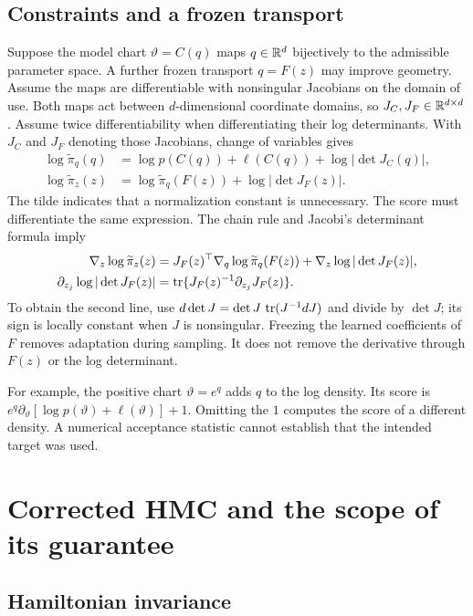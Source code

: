\subsection{Constraints and a frozen transport}

Suppose the model chart $\vartheta=C(q)$ maps $q\in\mathbb{R}^d$ bijectively to
the admissible parameter space. A further frozen transport $q=F(z)$ may
improve geometry. Assume the maps are differentiable with nonsingular
Jacobians on the domain of use. Both maps act between $d$-dimensional
coordinate domains, so $J_C,J_F\in\mathbb{R}^{d\times d}$. Assume twice
differentiability when differentiating their log determinants. With $J_C$
and $J_F$ denoting those Jacobians, change of variables gives
\begin{align}
 \log\widetilde\pi_q(q)
 &=\log p(C(q))+\ell(C(q))+\log|\det J_C(q)|,\\
 \log\widetilde\pi_z(z)
 &=\log\widetilde\pi_q(F(z))+\log|\det J_F(z)|.
 \label{eq:bf-modern-transformed-target}
\end{align}
The tilde indicates that a normalization constant is unnecessary. The score
must differentiate the same expression. The chain rule and Jacobi's
determinant formula imply
\begin{align}
 \nabla_z\log\widetilde\pi_z(z)
 &=J_F(z)^\top\nabla_q\log\widetilde\pi_q(F(z))
      +\nabla_z\log|\det J_F(z)|,\\
 \partial_{z_j}\log|\det J_F(z)|
 &=\operatorname{tr}\{J_F(z)^{-1}\partial_{z_j}J_F(z)\}.
 \label{eq:bf-modern-transformed-score}
\end{align}
To obtain the second line, use
$d\det J=\det J\,\operatorname{tr}(J^{-1}dJ)$ and divide by $\det J$; its sign is
locally constant when $J$ is nonsingular. Freezing the learned coefficients
of $F$ removes adaptation during sampling. It does not remove the derivative
through $F(z)$ or the log determinant.

For example, the positive chart $\vartheta=e^q$ adds $q$ to the log density.
Its score is
$e^q\partial_\vartheta[\log p(\vartheta)+\ell(\vartheta)]+1$.
Omitting the $1$ computes the score of a different density. A numerical
acceptance statistic cannot establish that the intended target was used.

\section{Corrected HMC and the scope of its guarantee}
\label{sec:bf-modern-hmc-foundation}

\subsection{Hamiltonian invariance}

